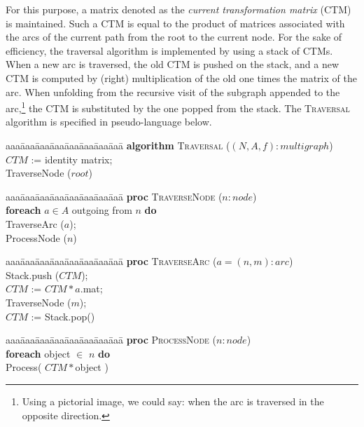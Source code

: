 \begin{coding}
For this purpose, a matrix denoted as the \emph{current transformation
matrix} (CTM) is maintained.  Such a CTM is equal to the product of
matrices associated with the arcs of the current path from the root to
the current node.  For the sake of efficiency, the traversal algorithm is
implemented by using a stack of CTMs.  When a new arc is traversed,
the old CTM is pushed on the stack, and a new CTM is computed by
(right) multiplication of the old one times the matrix of the arc. 
When unfolding from the recursive visit of the subgraph appended to the
arc,\footnote{Using a pictorial image, we could say: when the arc is
traversed in the opposite direction.} the CTM is substituted by the one
popped from the stack.  The \textsc{Traversal} algorithm is specified
in pseudo-language below.


\begin{script}
\begin{tabbing}
aaa\=aaa\=aaa\=aaa\=aaa\=aaa\=aaa\=aaa\=\kill
{\bf algorithm} \textsc{Traversal} ($(N,A,f): multigraph$) \+\\
   $CTM$ := identity matrix;\\
    TraverseNode ($root$)
\end{tabbing}


\begin{tabbing}
aaa\=aaa\=aaa\=aaa\=aaa\=aaa\=aaa\=aaa\=\kill
{\bf proc} \textsc{TraverseNode} ($n: node$) \+\\
  \textbf{foreach} $a\in A
  $ outgoing from $n$
  \textbf{do} \+\\
    TraverseArc ($a$); \\
  ProcessNode ($n$)
\end{tabbing}


\begin{tabbing}
aaa\=aaa\=aaa\=aaa\=aaa\=aaa\=aaa\=aaa\=\kill
{\bf proc} \textsc{TraverseArc} ($a=(n,m): arc$) \+\\ 
  Stack.push ($CTM$);\\
  $CTM$ := $CTM * a$.mat;\\
  TraverseNode ($m$);\\
  $CTM$ := Stack.pop()
\end{tabbing}



\begin{tabbing}
aaa\=aaa\=aaa\=aaa\=aaa\=aaa\=aaa\=aaa\=\kill
{\bf proc} \textsc{ProcessNode} ($n: node$) \+\\ 
  \textbf{foreach} object $\in$ $n$ \textbf{do} \+\\
    Process( $CTM * $object )
\end{tabbing}
\end{script}


\end{coding}
